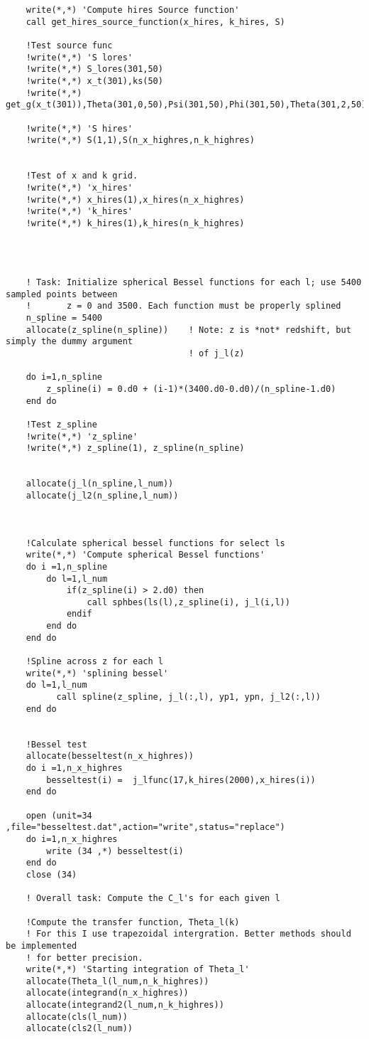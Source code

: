 \documentclass[a4paper]{report}
\begin{document}
\begin{verbatim}
    write(*,*) 'Compute hires Source function'
    call get_hires_source_function(x_hires, k_hires, S)
    
    !Test source func
    !write(*,*) 'S lores'
    !write(*,*) S_lores(301,50)
    !write(*,*) x_t(301),ks(50)
    !write(*,*) get_g(x_t(301)),Theta(301,0,50),Psi(301,50),Phi(301,50),Theta(301,2,50)

    !write(*,*) 'S hires'
    !write(*,*) S(1,1),S(n_x_highres,n_k_highres)


    !Test of x and k grid.
    !write(*,*) 'x_hires'
    !write(*,*) x_hires(1),x_hires(n_x_highres)
    !write(*,*) 'k_hires'
    !write(*,*) k_hires(1),k_hires(n_k_highres)

    


    ! Task: Initialize spherical Bessel functions for each l; use 5400 sampled points between 
    !       z = 0 and 3500. Each function must be properly splined
    n_spline = 5400
    allocate(z_spline(n_spline))    ! Note: z is *not* redshift, but simply the dummy argument
                                    ! of j_l(z)

    do i=1,n_spline
        z_spline(i) = 0.d0 + (i-1)*(3400.d0-0.d0)/(n_spline-1.d0)
    end do 

    !Test z_spline
    !write(*,*) 'z_spline'
    !write(*,*) z_spline(1), z_spline(n_spline)


    allocate(j_l(n_spline,l_num))
    allocate(j_l2(n_spline,l_num))



    !Calculate spherical bessel functions for select ls
    write(*,*) 'Compute spherical Bessel functions'
    do i =1,n_spline
        do l=1,l_num
            if(z_spline(i) > 2.d0) then
                call sphbes(ls(l),z_spline(i), j_l(i,l))
            endif
        end do
    end do

    !Spline across z for each l
    write(*,*) 'splining bessel'
    do l=1,l_num
          call spline(z_spline, j_l(:,l), yp1, ypn, j_l2(:,l))
    end do


    !Bessel test
    allocate(besseltest(n_x_highres))
    do i =1,n_x_highres 
        besseltest(i) =  j_lfunc(17,k_hires(2000),x_hires(i))
    end do

    open (unit=34 ,file="besseltest.dat",action="write",status="replace")
    do i=1,n_x_highres
        write (34 ,*) besseltest(i)
    end do 
    close (34)

    ! Overall task: Compute the C_l's for each given l

    !Compute the transfer function, Theta_l(k)
    ! For this I use trapezoidal intergration. Better methods should be implemented
    ! for better precision.
    write(*,*) 'Starting integration of Theta_l'
    allocate(Theta_l(l_num,n_k_highres))
    allocate(integrand(n_x_highres))
    allocate(integrand2(l_num,n_k_highres))
    allocate(cls(l_num))
    allocate(cls2(l_num))


\end{verbatim}
\end{document}
